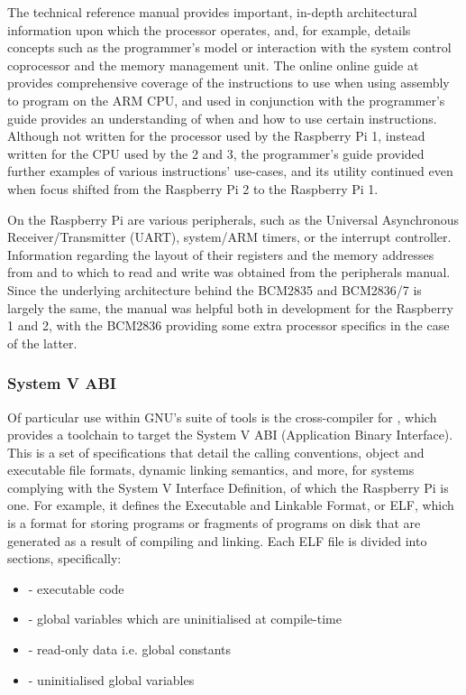         The technical reference manual provides important, in-depth
        architectural information upon which the processor operates, and, for
        example, details concepts such as the programmer's model or interaction
        with the system control coprocessor and the memory management unit. The
        online online guide at \cite{OnlineARMGuide} provides comprehensive
        coverage of the instructions to use when using assembly to program on
        the ARM CPU, and used in conjunction with the programmer's guide
        provides an understanding of when and how to use certain instructions.
        Although not written for the processor used by the Raspberry Pi 1,
        instead written for the CPU used by the 2 and 3, the programmer's guide
        provided further examples of various instructions' use-cases, and its
        utility continued even when focus shifted from the Raspberry Pi 2 to the
        Raspberry Pi 1.

        On the Raspberry Pi are various peripherals, such as the Universal
        Asynchronous Receiver/Transmitter (UART), system/ARM timers, or the
        interrupt controller. Information regarding the layout of their
        registers and the memory addresses from and to which to read and write
        was obtained from the peripherals manual. Since the underlying
        architecture behind the BCM2835 and BCM2836/7 is largely the same, the
        manual was helpful both in development for the Raspberry 1 and 2,
        with the BCM2836 \cite{BCM2836} providing some extra processor specifics
        in the case of the latter.

    \subsubsection{System V ABI}
        Of particular use within GNU's suite of tools is the cross-compiler for
        , which provides a toolchain to target the System V
        ABI (Application Binary Interface). This is a set of specifications that
        detail the calling conventions, object and executable file formats,
        dynamic linking semantics, and more, for systems complying with the
        System V Interface Definition, of which the Raspberry Pi is one. For
        example, it defines the Executable and Linkable Format, or ELF, which is
        a format for storing programs or fragments of programs on disk that are
        generated as a result of compiling and linking. Each ELF file is divided
        into sections, specifically:
        \begin{itemize}
            \label{tab:LinkerSections}
            \itemsep0em
            \item {} - executable code
            \item {} - global variables which are uninitialised at
                compile-time
            \item {} - read-only data i.e. global constants
            \item {} - uninitialised global variables
        \end{itemize}

